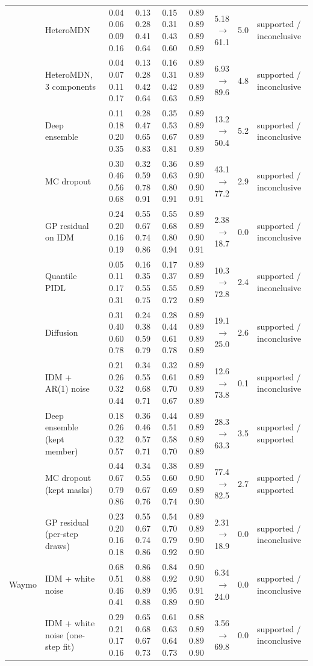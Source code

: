 \begin{longtable}{llrrrrrrl}
 & HeteroMDN & 0.04 0.06 0.09 0.16 & 0.13 0.28 0.41 0.64 & 0.15 0.31 0.43 0.60 & 0.89 0.89 0.89 0.89 & 5.18 $\rightarrow$ 61.1 & 5.0 & supported / inconclusive \\
 & HeteroMDN, 3 components & 0.04 0.07 0.11 0.17 & 0.13 0.28 0.42 0.64 & 0.16 0.31 0.42 0.63 & 0.89 0.89 0.89 0.89 & 6.93 $\rightarrow$ 89.6 & 4.8 & supported / inconclusive \\
 & Deep ensemble & 0.11 0.18 0.20 0.35 & 0.28 0.47 0.65 0.83 & 0.35 0.53 0.67 0.81 & 0.89 0.89 0.89 0.89 & 13.2 $\rightarrow$ 50.4 & 5.2 & supported / inconclusive \\
 & MC dropout & 0.30 0.46 0.56 0.68 & 0.32 0.59 0.78 0.91 & 0.36 0.63 0.80 0.91 & 0.89 0.90 0.90 0.91 & 43.1 $\rightarrow$ 77.2 & 2.9 & supported / inconclusive \\
 & GP residual on IDM & 0.24 0.20 0.16 0.19 & 0.55 0.67 0.74 0.86 & 0.55 0.68 0.80 0.94 & 0.89 0.89 0.90 0.91 & 2.38 $\rightarrow$ 18.7 & 0.0 & supported / inconclusive \\
 & Quantile PIDL & 0.05 0.11 0.17 0.31 & 0.16 0.35 0.55 0.75 & 0.17 0.37 0.55 0.72 & 0.89 0.89 0.89 0.89 & 10.3 $\rightarrow$ 72.8 & 2.4 & supported / inconclusive \\
 & Diffusion & 0.31 0.40 0.60 0.78 & 0.24 0.38 0.59 0.79 & 0.28 0.44 0.61 0.78 & 0.89 0.89 0.89 0.89 & 19.1 $\rightarrow$ 25.0 & 2.6 & supported / inconclusive \\
 & IDM + AR(1) noise & 0.21 0.26 0.32 0.44 & 0.34 0.55 0.68 0.71 & 0.32 0.61 0.70 0.67 & 0.89 0.89 0.89 0.89 & 12.6 $\rightarrow$ 73.8 & 0.1 & supported / inconclusive \\
 & Deep ensemble (kept member) & 0.18 0.26 0.32 0.57 & 0.36 0.46 0.57 0.71 & 0.44 0.51 0.58 0.70 & 0.89 0.89 0.89 0.89 & 28.3 $\rightarrow$ 63.3 & 3.5 & supported / supported \\
 & MC dropout (kept masks) & 0.44 0.67 0.79 0.86 & 0.34 0.55 0.67 0.76 & 0.38 0.60 0.69 0.74 & 0.89 0.90 0.89 0.90 & 77.4 $\rightarrow$ 82.5 & 2.7 & supported / supported \\
 & GP residual (per-step draws) & 0.23 0.20 0.16 0.18 & 0.55 0.67 0.74 0.86 & 0.54 0.70 0.79 0.92 & 0.89 0.89 0.90 0.90 & 2.31 $\rightarrow$ 18.9 & 0.0 & supported / inconclusive \\
\midrule
Waymo & IDM + white noise & 0.68 0.51 0.46 0.41 & 0.86 0.88 0.89 0.88 & 0.84 0.92 0.95 0.89 & 0.90 0.90 0.91 0.90 & 6.34 $\rightarrow$ 24.0 & 0.0 & supported / inconclusive \\
 & IDM + white noise (one-step fit) & 0.29 0.21 0.17 0.16 & 0.65 0.68 0.67 0.73 & 0.61 0.63 0.64 0.73 & 0.88 0.89 0.89 0.90 & 3.56 $\rightarrow$ 69.8 & 0.0 & supported / inconclusive \\

\end{longtable}
